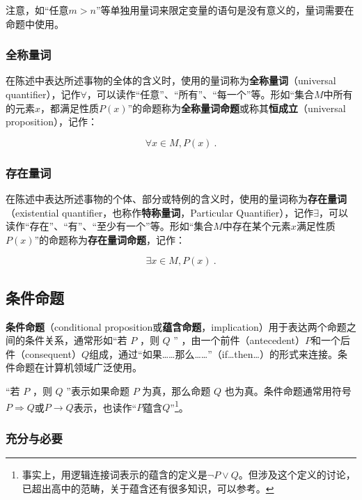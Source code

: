 注意，如“任意$m>n$”等单独用量词来限定变量的语句是没有意义的，量词需要在命题中使用。

\subsubsection{全称量词}

在陈述中表达所述事物的全体的含义时，使用的量词称为\textbf{全称量词}（universal quantifier），记作$\forall$，可以读作“任意”、“所有”、“每一个”等。形如“集合$M$中所有的元素$x$，都满足性质$P(x)$”的命题称为\textbf{全称量词命题}或称其\textbf{恒成立}（universal proposition），记作：


\begin{equation}
\forall x\in M,P(x)~.
\end{equation}

\subsubsection{存在量词}

在陈述中表达所述事物的个体、部分或特例的含义时，使用的量词称为\textbf{存在量词}（existential quantifier，也称作\textbf{特称量词}，Particular Quantifier），记作$\exists$，可以读作“存在”、“有”、“至少有一个”等。形如“集合$M$中存在某个元素$x$满足性质$P(x)$”的命题称为\textbf{存在量词命题}，记作：

\begin{equation}
\exists x\in M,P(x)~.
\end{equation}

\subsection{条件命题}

\textbf{条件命题}（conditional proposition或\textbf{蕴含命题}，implication）用于表达两个命题之间的条件关系，通常形如“若 $P$ ，则 $Q$ ” ，由一个前件（antecedent）$P$和一个后件（consequent）$Q$组成，通过“如果……那么……”（if…then…）的形式来连接。条件命题在计算机领域广泛使用。

“若 $P$ ，则 $Q$ ”表示如果命题 $P$ 为真，那么命题 $Q$ 也为真。条件命题通常用符号$P\Rightarrow Q$或$P\rightarrow Q$表示，也读作“$P$蕴含$Q$”\footnote{事实上，用逻辑连接词表示的蕴含的定义是$\lnot P\lor Q$。但涉及这个定义的讨论，已超出高中的范畴，关于蕴含还有很多知识，可以参考。}。

\subsubsection{充分与必要}

